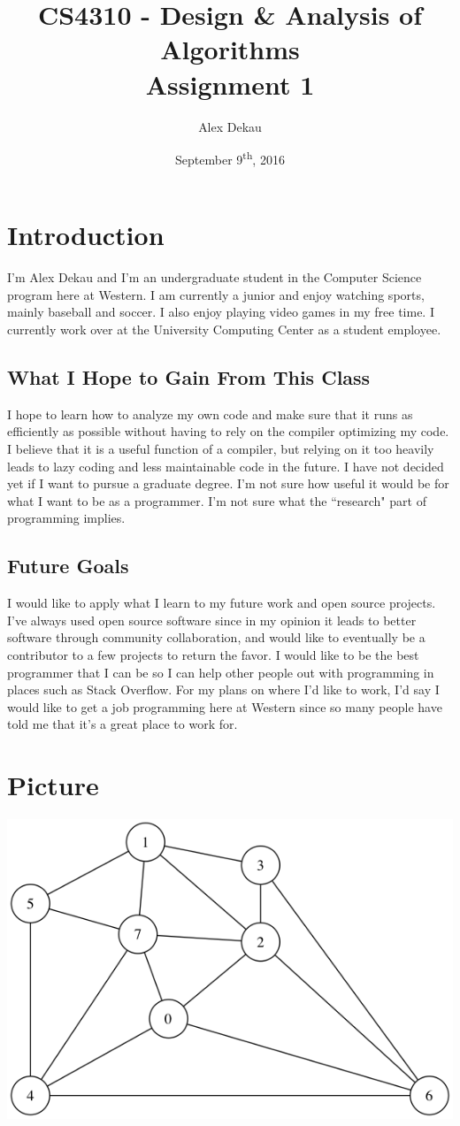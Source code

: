 \documentclass[11pt,oneside]{article}
\begin{document}
\title{CS4310 - Design \& Analysis of Algorithms\\Assignment 1}
\author{Alex Dekau}
\date{September 9\textsuperscript{th}, 2016}
\maketitle
\tableofcontents

\section{Introduction}
I'm Alex Dekau and I'm an undergraduate student in the Computer Science program here at Western. I am currently a junior and enjoy watching sports, mainly baseball and soccer. I also enjoy playing video games in my free time. I currently work over at the University Computing Center as a student employee.

\subsection{What I Hope to Gain From This Class}
I hope to learn how to analyze my own code and make sure that it runs as efficiently as possible without having to rely on the compiler optimizing my code. I believe that it is a useful function of a compiler, but relying on it too heavily leads to lazy coding and less maintainable code in the future. I have not decided yet if I want to pursue a graduate degree. I'm not sure how useful it would be for what I want to be as a programmer. I'm not sure what the ``research" part of programming implies.

\subsection{Future Goals}
I would like to apply what I learn to my future work and open source projects. I've always used open source software since in my opinion it leads to better software through community collaboration, and would like to eventually be a contributor to a few projects to return the favor. I would like to be the best programmer that I can be so I can help other people out with programming in places such as Stack Overflow. For my plans on where I'd like to work, I'd say I would like to get a job programming here at Western since so many people have told me that it's a great place to work for. 


\section{Picture}
\begin{center}
\includegraphics[scale=0.75]{graph.png}
\end{center}
\end{document}
